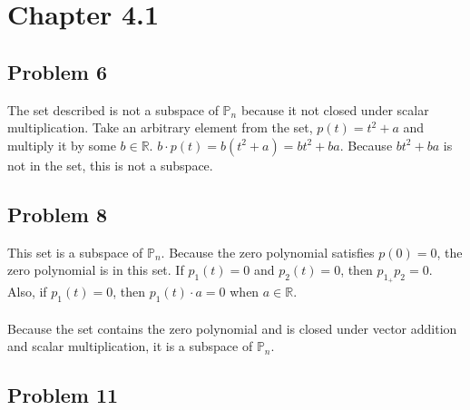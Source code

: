 \documentclass{article}%
\begin{document}
\section*{Chapter 4.1}

\subsection*{Problem 6}

The set described is not a subspace of $\mathbb{P}_n$ because it not closed under scalar multiplication. Take an arbitrary element from the set, $p(t) = t^2 + a$ and multiply it by some
$b \in \mathbb{R}$. $b \cdot p(t) = b(t^2 + a) = bt^2 + ba$. Because $bt^2 + ba$ is not in the set, this is not a subspace.

\subsection*{Problem 8}

This set is a subspace of $\mathbb{P}_n$. Because the zero polynomial satisfies $p(0) = 0$, the zero polynomial is in this set. If $p_1(t) = 0$ and $p_2(t) = 0$, then $p_1_ + p_2 = 0$.
Also, if $p_1(t) = 0$, then $p_1(t) \cdot a = 0$ when $a \in \mathbb{R}$.\\
\\
Because the set contains the zero polynomial and is closed under vector addition and scalar multiplication, it is a subspace of $\mathbb{P}_n$.

\subsection*{Problem 11}
\end{document}
